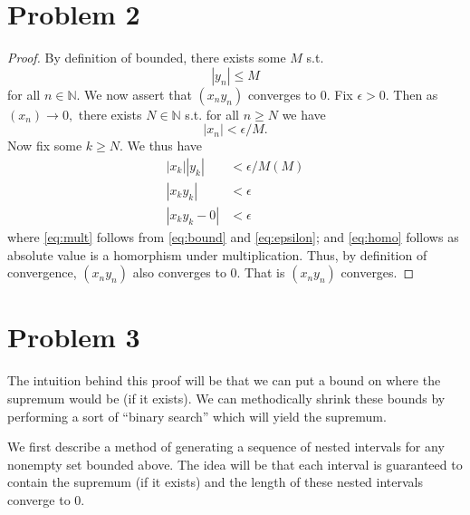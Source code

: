 \documentclass[10pt]{article}
\begin{document}
\newpage
\section*{Problem 2}
\begin{proof}
    By definition of bounded, there exists some $M$ s.t. 
    \begin{equation} \label{eq:bound}
        |y_n|\le M
    \end{equation}
    for all $n\in\mathbb{N}.$ We now assert that $(x_ny_n)$ converges to $0$. Fix $\epsilon>0.$ Then as $(x_n)\to 0,$ there exists $N\in\mathbb{N}$ s.t. for all $n\ge N$ we have
    \begin{equation}
        |x_n|<\epsilon/M. \label{eq:epsilon}
    \end{equation}
    Now fix some $k\ge N.$ We thus have
    \begin{align}
        |x_k||y_k| &< \epsilon/M(M) \label{eq:mult}\\
        |x_ky_k| &<\epsilon \label{eq:homo}\\
        |x_ky_k-0|&<\epsilon \nonumber
    \end{align}
    where \eqref{eq:mult} follows from \eqref{eq:bound} and \eqref{eq:epsilon}; and \eqref{eq:homo} follows as absolute value is a homorphism under multiplication.
    Thus, by definition of convergence, $(x_ny_n)$ also converges to $0$. That is $(x_ny_n)$ converges.
\end{proof}

\newpage
\section*{Problem 3}
The intuition behind this proof will be that we can put a bound on where the supremum would be (if it exists). We can methodically shrink these bounds by performing a sort of ``binary search'' which will yield the supremum.

We first describe a method of generating a sequence of nested intervals for any nonempty set bounded above. The idea will be that each interval is guaranteed to contain the supremum (if it exists) and the length of these nested intervals converge to $0$.
\end{document}
